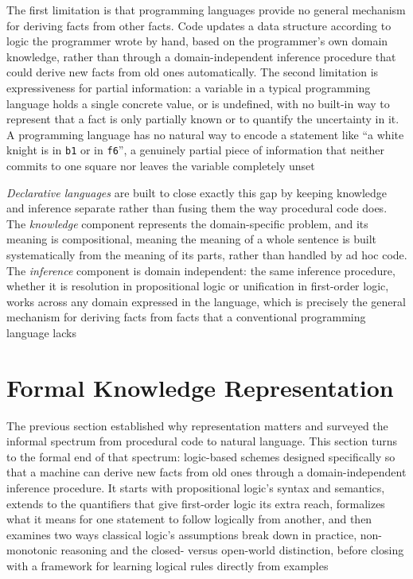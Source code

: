 The first limitation is that programming languages provide no general
mechanism for deriving facts from other facts. Code updates a data
structure according to logic the programmer wrote by hand, based on the
programmer's own domain knowledge, rather than through a domain-independent
inference procedure that could derive new facts from old ones automatically.
The second limitation is expressiveness for partial information: a variable
in a typical programming language holds a single concrete value, or is
undefined, with no built-in way to represent that a fact is only partially
known or to quantify the uncertainty in it. A programming language has no
natural way to encode a statement like ``a white knight is in \texttt{b1}
or in \texttt{f6}'', a genuinely partial piece of information that neither
commits to one square nor leaves the variable completely unset

\emph{Declarative languages} are built to close exactly this gap by keeping
knowledge and inference separate rather than fusing them the way procedural
code does. The \emph{knowledge} component represents the domain-specific
problem, and its meaning is compositional, meaning the meaning of a whole
sentence is built systematically from the meaning of its parts, rather than
handled by ad hoc code. The \emph{inference} component is domain
independent: the same inference procedure, whether it is resolution in
propositional logic or unification in first-order logic, works across any
domain expressed in the language, which is precisely the general mechanism
for deriving facts from facts that a conventional programming language
lacks

\section{Formal Knowledge Representation}
\label{sec:formal-knowledge-representation}

The previous section established why representation matters and surveyed
the informal spectrum from procedural code to natural language. This
section turns to the formal end of that spectrum: logic-based schemes
designed specifically so that a machine can derive new facts from old ones
through a domain-independent inference procedure. It starts with
propositional logic's syntax and semantics, extends to the quantifiers that
give first-order logic its extra reach, formalizes what it means for one
statement to follow logically from another, and then examines two ways
classical logic's assumptions break down in practice, non-monotonic
reasoning and the closed- versus open-world distinction, before closing
with a framework for learning logical rules directly from examples

